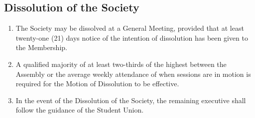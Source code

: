 \documentclass[parskip=half]{scrartcl}
\begin{document}
        \subsection{Dissolution of the Society}
            \label{gm--disolution}
            \begin{enumerate}
                \item The Society may be dissolved at a General Meeting, provided that at least twenty-one (21) days notice of the intention of dissolution has been given to the Membership.
                \item A qualified majority of at least two-thirds of the highest between the Assembly or the average weekly attendance of when sessions are in motion is required for the Motion of Dissolution to be effective.

                \item In the event of the Dissolution of the Society, the remaining executive shall follow the guidance of the Student Union.
            \end{enumerate}
            
\end{document}
